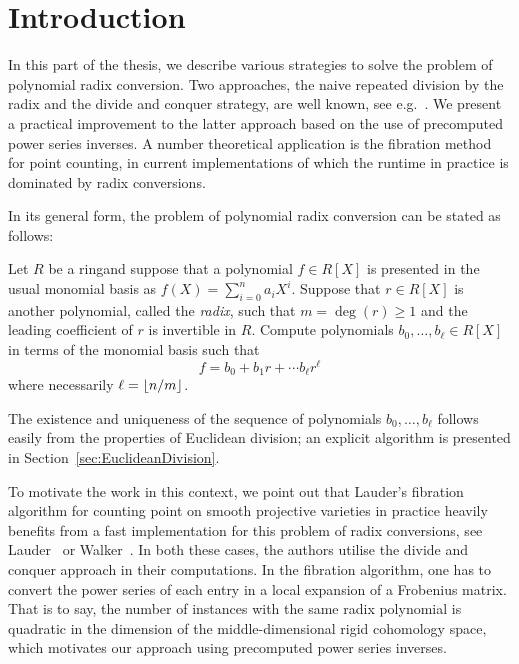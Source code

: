 
\chapter{Introduction}

In this part of the thesis, we describe various strategies to solve the 
problem of polynomial radix conversion.  Two approaches, the naive 
repeated division by the radix and the divide and conquer strategy, are 
well known, see e.g.~\citep[\S 9.2]{GathenGerhard2003}.  We present a 
practical improvement to the latter approach based on the use of 
precomputed power series inverses.  A number theoretical application is 
the fibration method for point counting, in current implementations of 
which the runtime in practice is dominated by radix conversions.

In its general form, the problem of polynomial radix conversion 
can be stated as follows:

\begin{prob} \label{prob:exact}
Let $R$ be a ring\footnotemark and suppose that a polynomial $f \in R[X]$ is 
presented in the usual monomial basis as $f(X) = \sum_{i=0}^{n} a_i X^i$.
Suppose that $r \in R[X]$ is another polynomial, called the \emph{radix}, 
such that $m = \deg(r) \geq 1$ and the leading coefficient of $r$ is invertible 
in $R$.  Compute polynomials $b_0, \dotsc, b_{\ell} \in R[X]$ in terms of 
the monomial basis such that 
\begin{equation}
f = b_0 + b_1 r + \dotsb b_{\ell} r^{\ell}
\end{equation}
where necessarily $\ell = \left\lfloor n / m\right\rfloor$.
\end{prob}


The existence and uniqueness of the sequence of polynomials $b_0, \dotsc, b_{\ell}$ 
follows easily from the properties of Euclidean division;  an explicit algorithm is 
presented in Section~\ref{sec:EuclideanDivision}.

To motivate the work in this context, we point out that Lauder's 
fibration algorithm for counting point on smooth projective varieties 
in practice heavily benefits from a fast implementation for this problem 
of radix conversions, see Lauder~\citep[\S 6.5.2]{Lauder2006} or 
Walker~\citep[\S 3.2.2]{Walker2009}.  In both these cases, the authors 
utilise the divide and conquer approach in their computations.  In the 
fibration algorithm, one has to convert the power series of each 
entry in a local expansion of a Frobenius matrix.  That is to say, 
the number of instances with the same radix polynomial is quadratic 
in the dimension of the middle-dimensional rigid cohomology space, 
which motivates our approach using precomputed power series inverses.

